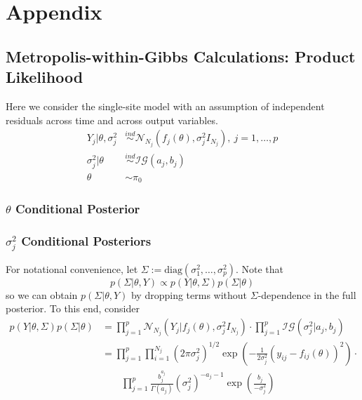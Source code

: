 \documentclass[12pt]{article}
\begin{document}
\section{Appendix}

\subsection{Metropolis-within-Gibbs Calculations: Product Likelihood}
Here we consider the single-site model with an assumption of independent residuals across time and across output variables.
\begin{align*}
Y_j|\theta, \sigma_j^2 &\overset{ind}{\sim} \mathcal{N}_{N_j}(f_j(\theta), \sigma_j^2 I_{N_j}), \ j = 1, \dots, p \\
\sigma_j^2 |\theta &\overset{ind}{\sim} \mathcal{IG}(a_j, b_j) \\
\theta &\sim \pi_0 
\end{align*}

\subsubsection{$\theta$ Conditional Posterior}

\subsubsection{$\sigma_j^2$ Conditional Posteriors}
For notational convenience, let $\Sigma := \text{diag}\left(\sigma_1^2, \dots, \sigma_p^2 \right)$. Note that 
\[p(\Sigma|\theta, Y) \propto p(Y|\theta, \Sigma)p(\Sigma|\theta)\]
so we can obtain $p(\Sigma|\theta, Y)$ by dropping terms without $\Sigma$-dependence in the full posterior. To this end, consider 
\begin{align*}
p(Y|\theta, \Sigma)p(\Sigma|\theta) &= \prod_{j = 1}^{p} \mathcal{N}_{N_j}(Y_j|f_j(\theta), \sigma_j^2 I_{N_j}) \cdot \prod_{j = 1}^{p} \mathcal{IG}(\sigma_j^2|a_j, b_j) \\
						      &= \prod_{j = 1}^{p} \prod_{i = 1}^{N_j} \left(2\pi \sigma_j^2\right)^{1/2} \exp\left(-\frac{1}{2\sigma_j^2}(y_{ij} - f_{ij}(\theta))^2 \right) \cdot \\
						      &\qquad \prod_{j = 1}^{p} \frac{b_j^{a_j}}{\Gamma(a_j)} \left(\sigma_j^2\right)^{-a_j - 1} \exp\left(\frac{b_j}{-\sigma_j^2}\right)
\end{align*}	
\end{document}
